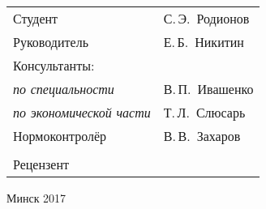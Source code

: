 \begin{titlepage}
\begin{center}
    \begin{tabular}{ p{}p{} }
      Студент & С.\,Э.~Родионов \\
      Руководитель & Е.\,Б.~Никитин \\
      Консультанты: &\\
      \hspace*{3ex}\emph{по специальности} & В.\,П.~Ивашенко \\
      \hspace*{3ex}\emph{по экономической части} & Т.\,Л.~Слюсарь \\
      Нормоконтролёр & В.\,В.~Захаров\\
      & \\
      Рецензент &
    \end{tabular}
    
    \vfill
    {\normalsize Минск 2017}
  \end{center}
\end{titlepage}